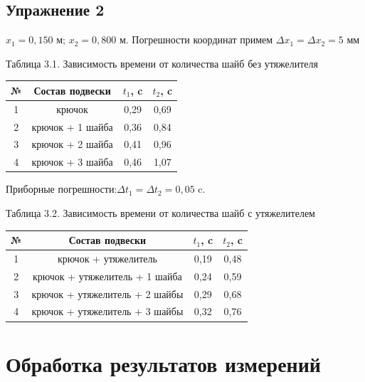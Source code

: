 \documentclass[12pt]{article}
\begin{document}
\subsection*{Упражнение 2}
\begin{center}
$x_{1} = 0,150$ м; $x_{2} = 0,800$ м. Погрешности координат примем $\Delta x_{1} = \Delta x_{2}  = 5$ мм

Таблица 3.1. Зависимость времени от количества шайб без утяжелителя
\begin{table}[h!]
\begin{center}
\begin{tabular}{|c|c|c|c|}
\hline
 № & Состав подвески & $t_{1}$, c & $t_{2}$, c \\
\hline
 1 &    крючок &	0,29	 &0,69 \\
\hline

 2 & крючок + 1 шайба &	0,36	 &0,84 \\
\hline
 3 &  крючок + 2 шайба &	0,41 &	0,96 \\
\hline
 4 &крючок + 3 шайба &	0,46	 &1,07 \\
\hline

\end{tabular}

Приборные погрешности:$\Delta t_{1}=\Delta t_{2} = 0,05$ c. 
\end{center}
\end{table}

Таблица 3.2. Зависимость времени от количества шайб с утяжелителем
\begin{table}[h!]
\begin{center}
\begin{tabular}{|c|c|c|c|}
\hline
 № & Состав подвески & $t_{1}$, c & $t_{2}$, c \\
\hline
 1 &    крючок + утяжелитель&	0,19&	0,48\\
\hline

 2 & крючок + утяжелитель + 1 шайба&	0,24&	0,59 \\
\hline
 3 & крючок + утяжелитель + 2 шайбы&	0,29&	0,68 \\
\hline
 4 &крючок + утяжелитель + 3 шайбы	&0,32&	0,76 \\
\hline
\end{tabular}
\end{center}
\end{table}             
\end{center}

\section*{Обработка результатов измерений}
\end{document}
